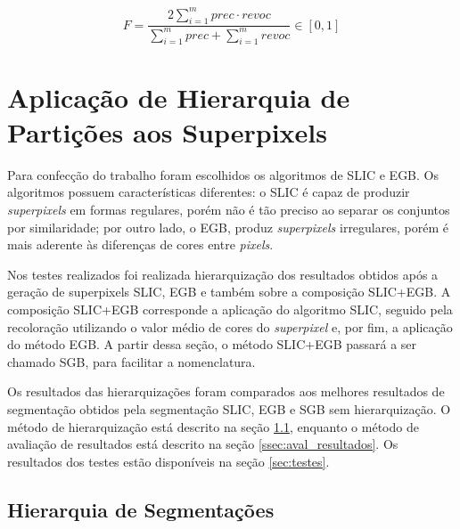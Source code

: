 \begin{document}
\begin{equation}
 F=\frac{ 2 \sum\limits_{i=1}^m {prec \cdot revoc}}{ \sum\limits_{i=1}^m {prec} + \sum\limits_{i=1}^m {revoc}}  \in [0,1]
 \label{equ:PREC_RECALL}
\end{equation}


\section{Aplicação de Hierarquia de Partições aos Superpixels} \label{sec:mat_metodos}

Para confecção do trabalho foram escolhidos os algoritmos de SLIC e EGB. Os algoritmos possuem características diferentes: o SLIC é capaz de produzir \textit{superpixels} em formas regulares, porém não é tão preciso ao separar os conjuntos por similaridade; por outro lado, o EGB, produz \textit{superpixels} irregulares, porém é mais aderente às diferenças de cores entre \textit{pixels}.

Nos testes realizados foi realizada hierarquização dos resultados obtidos após a geração de superpixels SLIC, EGB e também sobre a composição SLIC+EGB. A composição SLIC+EGB corresponde a aplicação do algoritmo SLIC, seguido pela recoloração utilizando o valor médio de cores do \textit{superpixel} e, por fim, a aplicação do método EGB. A partir dessa seção, o método SLIC+EGB passará a ser chamado SGB, para facilitar a nomenclatura.

Os resultados das hierarquizações foram comparados aos melhores resultados de segmentação obtidos pela segmentação SLIC, EGB e SGB sem hierarquização. O método de hierarquização está descrito na seção \ref{ssec:hierquia_segm}, enquanto o método de avaliação de resultados está descrito na seção \ref{ssec:aval_resultados}. Os resultados dos testes estão disponíveis na seção \ref{sec:testes}.


\subsection{Hierarquia de Segmentações} \label{ssec:hierquia_segm}

\end{document}
